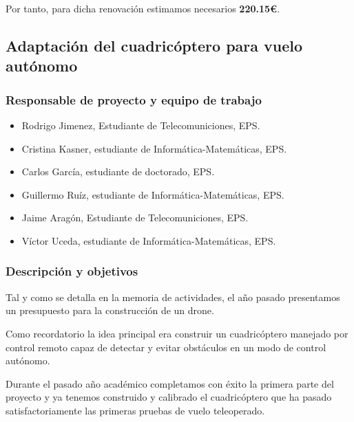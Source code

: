 \documentclass[12pt,twoside]{report}
\begin{document}
Por tanto, para dicha renovación estimamos necesarios \textbf{220.15\euro{}}.



\subsection{Adaptación del cuadricóptero para vuelo autónomo}
\subsubsection{Responsable de proyecto y equipo de trabajo}
\begin{itemize}
\item Rodrigo Jimenez, Estudiante de Telecomuniciones, EPS.
\item Cristina Kasner, estudiante de Informática-Matemáticas, EPS.
\item Carlos García, estudiante de doctorado, EPS.
\item Guillermo Ruíz, estudiante de Informática-Matemáticas, EPS.
\item Jaime Aragón, Estudiante de Telecomuniciones, EPS.
\item Víctor Uceda, estudiante de Informática-Matemáticas, EPS.
\end{itemize}
\subsubsection{Descripción y objetivos}
Tal y como se detalla en la memoria de actividades, el año pasado presentamos un presupuesto para la construcción de un drone.

Como recordatorio la idea principal era construir un cuadricóptero manejado por control remoto capaz de detectar y evitar obstáculos en un modo de control autónomo.

Durante el pasado año académico completamos con éxito la primera parte del proyecto y ya tenemos construido y calibrado el cuadricóptero que ha pasado satisfactoriamente las primeras pruebas de vuelo teleoperado.
\end{document}
